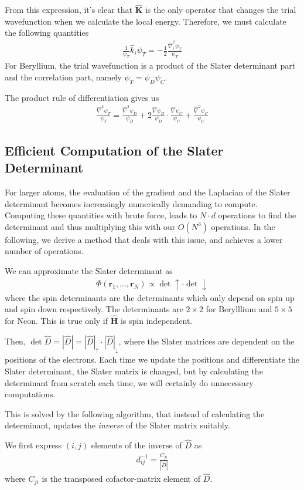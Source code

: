 \documentclass[twocolumns, a4paper,11pt,fleqn]{extarticle}
\newcommand{\eq}[1]{{\small\begin{align*}#1\end{align*}}}
\renewcommand\vec[1]{\boldsymbol{\mathbf{#1}}}
\newcommand{\OP}[1]{\mathbf{\widehat{#1}}}
\newcommand{\op}[1]{\hat{#1}}
\begin{document}
From this expression, it's clear that $\OP K$ is the only operator that changes the
trial wavefunction when we calculate the local energy. Therefore, we must calculate the
following quantities
\eq{
  \frac{1}{\psi_T}\op k_i \psi_T = -\frac{1}{2}\frac{\op\nabla_i^2 \psi_T}{\psi_T}
}
For Beryllium, the trial wavefunction is a product of the Slater determinant part 
and the correlation part, namely $\psi_T = \psi_D\psi_C$.

The product rule of differentiation gives us
\eq{
  \frac{\op\nabla^2 \psi_T}{\psi_T} = 
  \frac{\op\nabla^2 \psi_D}{\psi_D}
    +2 \frac{\op\nabla \psi_D}{\psi_D}\cdot\frac{\op\nabla \psi_C}{\psi_C}
    +\frac{\op\nabla^2 \psi_C}{\psi_C}
}

\subsection{Efficient Computation of the Slater Determinant}

For larger atoms, the evaluation of the gradient and the Laplacian of the Slater
determinant becomes increasingly numerically demanding
to compute. Computing these quantities with brute force, 
leads to $N\cdot d$ operations to find the determinant and thus
multiplying this with our $O(N^3)$ operations.
In the following, we derive a method that deals with this issue, 
and achieves a lower number of operations.

We can approximate the Slater determinant as
\eq{
	\Phi(\vec r_1, ..., \vec r_N) \propto \det\uparrow\cdot\det\downarrow
}
where the spin determinants are the determinants which only depend on spin up and spin down
respectively. The determinants are $2\times 2$ for Berylllium and $5\times 5$ for Neon.
This is true only if $\OP H$ is spin independent.

Then, $\det \op D = |\op D| = |\op D|_{\uparrow}\cdot |\op D|_{\downarrow}$, 
where the Slater matrices are dependent on the positions of the electrons. 
Each time we update the positions and differentiate the Slater determinant,
the Slater matrix is changed, but by calculating the determinant 
from scratch each time, we will certainly do unnecessary computations. 

This is solved by the following algorithm, that instead of calculating 
the determinant, updates the \textit{inverse} of the Slater matrix suitably.

We first express $(i,j)$ elements of the inverse of $\op D$ as
\eq{
  d_{ij}^{-1} = \frac{C_{ji}}{|\op D|}
}
where $C_{ji}$ is the transposed cofactor-matrix element of $\op D$.
\end{document}
